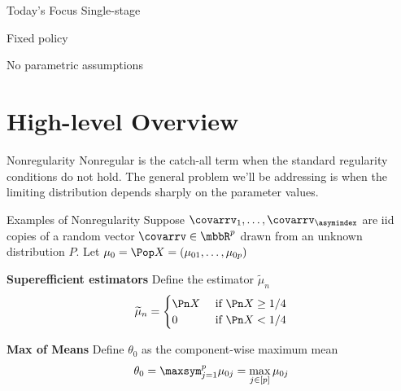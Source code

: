 \documentclass[aspectratio=169, professionalfonts]{beamer}
\begin{document}
\begin{frame}{Today's Focus}
	Single-stage

	Fixed policy

	No parametric assumptions
\end{frame}


\section{High-level Overview}
\begin{frame}{Nonregularity}
	Nonregular is the catch-all term when the standard regularity conditions do
	not hold. The general problem we'll be addressing is when the limiting
	distribution depends sharply on the parameter values.

	\vfill \pause

	\vfill
\end{frame}

\begin{frame}{Examples of Nonregularity}
	Suppose $\covarrv_1, \ldots, \covarrv_{\asymindex}$ are iid copies of a random vector
	$\covarrv \in \mbbR^{p}$ drawn from an unknown distribution $P$. Let $\mu_0 = \Pop X
		= (\mu_{01}, \ldots, \mu_{0p})$

	\vfill \pause

	\textbf{Superefficient estimators}
	Define the estimator $\widetilde{\mu}_n$
	\begin{displaymath}
		\widetilde{\mu}_n = \begin{cases} \Pn X & \text { if } \Pn X \geq 1/4 \\
              0     & \text { if } \Pn X < 1/4\end{cases}
	\end{displaymath}

	\vfill \pause

	\textbf{Max of Means}
	Define $\theta_0$ as the component-wise maximum mean
	\begin{displaymath}
		\theta_0 = \maxsym_{j = 1}^p \mu_{0j} = \max_{j \in [p]} \mu_{0j}
	\end{displaymath}
\end{frame}
\end{document}
